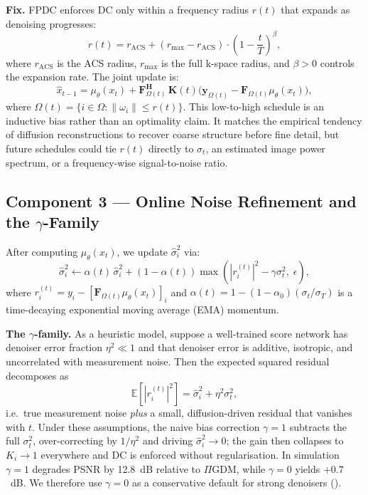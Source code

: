 \documentclass[10pt,twocolumn,letterpaper]{article}
\newcommand{\hatsig}{\hat{\sigma}}
\newcommand{\muth}{\mu_\theta}
\begin{document}
\textbf{Fix.} FPDC enforces DC only within a frequency radius $r(t)$ that
expands as denoising progresses:
\begin{equation}
  r(t) = r_{\text{ACS}} + (r_{\max} - r_{\text{ACS}})
  \cdot \left(1 - \frac{t}{T}\right)^\beta,
  \label{eq:fpdc}
\end{equation}
where $r_{\text{ACS}}$ is the ACS radius, $r_{\max}$ is the full k-space
radius, and $\beta > 0$ controls the expansion rate. The joint update is:
\begin{equation}
  \hat{x}_{t-1} = \muth(x_t) + \mathbf{F}_{\Omega(t)}^\mathbf{H}\,
  \mathbf{K}(t)\bigl(\mathbf{y}_{\Omega(t)} -
  \mathbf{F}_{\Omega(t)}\muth(x_t)\bigr),
  \label{eq:combined}
\end{equation}
where $\Omega(t) = \{i \in \Omega : \|\omega_i\| \leq r(t)\}$.
This low-to-high schedule is an inductive bias rather than an optimality
claim. It matches the empirical tendency of diffusion reconstructions to
recover coarse structure before fine detail, but future schedules could tie
$r(t)$ directly to $\sigma_t$, an estimated image power spectrum, or a
frequency-wise signal-to-noise ratio.

\subsection{\texorpdfstring{Component 3 — Online Noise Refinement and the $\gamma$-Family}{Component 3 — Online Noise Refinement and the gamma-Family}}

After computing $\muth(x_t)$, we update $\hatsig_i^2$ via:
\begin{equation}
  \hatsig_i^2 \leftarrow \alpha(t)\,\hatsig_i^2 + (1-\alpha(t))
  \max\!\left(|r_i^{(t)}|^2 - \gamma\sigma_t^2,\; \epsilon\right),
  \label{eq:mstep}
\end{equation}
where $r_i^{(t)} = y_i - [\mathbf{F}_{\Omega(t)}\muth(x_t)]_i$ and
$\alpha(t) = 1 - (1-\alpha_0)(\sigma_t / \sigma_T)$ is a time-decaying
exponential moving average (EMA) momentum.

\textbf{The $\gamma$-family.} As a heuristic model, suppose a well-trained
score network has denoiser error fraction $\eta^2\!\ll\!1$ and that denoiser
error is additive, isotropic, and uncorrelated with measurement noise. Then the
expected squared residual decomposes as
\begin{equation}
  \mathbb{E}\!\left[|r_i^{(t)}|^2\right] = \hatsig_i^2 + \eta^2\sigma_t^2 ,
  \label{eq:gamma_decomp}
\end{equation}
i.e.\ true measurement noise \emph{plus} a small, diffusion-driven residual
that vanishes with $t$. Under these assumptions, the naive bias correction
$\gamma{=}1$ subtracts the full $\sigma_t^2$, over-correcting by $1/\eta^2$ and driving
$\hatsig_i^2\!\to\!0$; the gain then collapses to $K_i\!\to\!1$ everywhere
and DC is enforced without regularisation. In simulation $\gamma{=}1$
degrades PSNR by 12.8~dB relative to $\Pi$GDM, while $\gamma{=}0$ yields
$+0.7$~dB. We therefore use $\gamma{=}0$ as a conservative default for strong
denoisers ().
\end{document}
